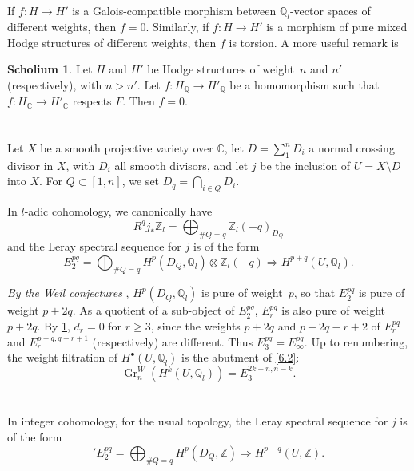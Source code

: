\documentclass{article}
\theoremstyle{plain}
\theoremstyle{definition}
\newtheorem*{scholium*}{Scholium}
\newcommand{\ZZ}{\mathbb{Z}}
\newcommand{\QQ}{\mathbb{Q}}
\newcommand{\CC}{\mathbb{C}}
\DeclareMathOperator{\Gr}{Gr}
\renewcommand{\geq}{\geqslant}
\begin{document}
\section{}
\label{5}

If $f\colon H\to H'$ is a Galois-compatible morphism between $\QQ_l$-vector spaces of different weights, then $f=0$.
Similarly, if $f\colon H\to H'$ is a morphism of pure mixed Hodge structures of different weights, then $f$ is torsion.
A more useful remark is

\begin{scholium*}
  Let $H$ and $H'$ be Hodge structures of weight~$n$ and $n'$ (respectively), with $n>n'$.
  Let $f\colon H_\QQ\to H'_\QQ$ be a homomorphism such that $f\colon H_\CC\to H'_\CC$ respects $F$.
  Then $f=0$.
\end{scholium*}


\section{}
\label{6}

Let $X$ be a smooth projective variety over $\CC$, let $D=\sum_1^n D_i$ a normal crossing divisor in $X$, with $D_i$ all smooth divisors, and let $j$ be the inclusion of $U=X\setminus D$ into $X$.
For $Q\subset[1,n]$, we set $D_q=\bigcap_{i\in Q}D_i$.

In $l$-adic cohomology, we canonically have
\[
  R^q j_* \ZZ_l = \bigoplus_{\#Q=q} \ZZ_l(-q)_{D_Q}
\tag{6.1}
\]
and the Leray spectral sequence for $j$ is of the form
\[
\label{6.2}
  E_2^{pq}
  = \bigoplus_{\#Q=q} H^p(D_Q,\QQ_l)\otimes\ZZ_l(-q)
  \Rightarrow H^{p+q}(U,\QQ_l).
\tag{6.2}
\]

\emph{By the Weil conjectures} \cite{5}, $H^p(D_Q,\QQ_l)$ is pure of weight~$p$, so that $E_2^{pq}$ is pure of weight $p+2q$.
As a quotient of a sub-object of $E_2^{pq}$, $E_r^{pq}$ is also pure of weight $p+2q$.
By \cref{5}, $d_r=0$ for $r\geq3$, since the weights $p+2q$ and $p+2q-r+2$ of $E_r^{pq}$ and $E_r^{p+q,q-r+1}$ (respectively) are different.
Thus $E_3^{pq}=E_\infty^{pq}$.
Up to renumbering, the weight filtration of $H^\bullet(U,\QQ_l)$ is the abutment of \cref{6.2}:
\[
\label{6.3}
  \Gr_n^W(H^k(U,\QQ_l)) = E_3^{2k-n,n-k}.
\tag{6.3}
\]


\section{}
\label{7}

In integer cohomology, for the usual topology, the Leray spectral sequence for $j$ is of the form
\[
\label{7.1}
  'E_2^{pq}
  = \bigoplus_{\#Q=q} H^p(D_Q,\ZZ)
  \Rightarrow H^{p+q}(U,\ZZ).
\tag{7.1}
\]
\end{document}
